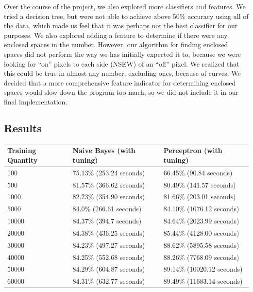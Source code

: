 \documentclass{article}
\theoremstyle{remark}
\begin{document}
    	Over the course of the project, we also explored more classifiers and features. We tried a decision tree, but were not able to achieve above 50\% accuracy using all of the data, which made us feel that it was perhaps not the best classifier for our purposes. We also explored adding a feature to determine if there were any enclosed spaces in the number. However, our algorithm for finding enclosed spaces did not perform the way we has initially expected it to, because we were looking for ``on'' pixels to each side (NSEW) of an ``off'' pixel. We realized that this could be true in almost any number, excluding ones, because of curves. We decided that a more comprehensive feature indicator for determining enclosed spaces would slow down the program too much, so we did not include it in our final implementation.
     \subsection*{Results}
     \begin{table}[h!]
        \centering
        \begin{tabular}{l|l|l}
        Training Quantity & Naive Bayes (with tuning) & Perceptron (with tuning)   \\ \hline
        100               & 75.13\% (253.24 seconds)  & 66.45\% (90.84 seconds)    \\
        500               & 81.57\% (366.62 seconds)  & 80.49\% (141.57 seconds)   \\
        1000              & 82.23\% (354.90 seconds)  & 81.66\% (203.01 seconds)   \\
        5000              & 84.0\% (266.61 seconds)   & 84.10\% (1076.12 seconds)  \\
        10000             & 84.37\% (394.7 seconds)   & 84.64\% (2023.99 seconds)  \\
        20000             & 84.38\% (436.25 seconds)  & 85.44\% (4128.00 seconds)  \\
        30000             & 84.23\% (497.27 seconds)  & 88.62\% (5895.58 seconds)  \\
        40000             & 84.25\% (552.68 seconds)  & 88.26\% (7768.09 seconds)  \\
        50000             & 84.29\% (604.87 seconds)  & 89.14\% (10020.12 seconds) \\
        60000             & 84.31\% (632.77 seconds)  & 89.49\% (11683.14 seconds) \\
        \end{tabular}
     \end{table}
\end{document}
